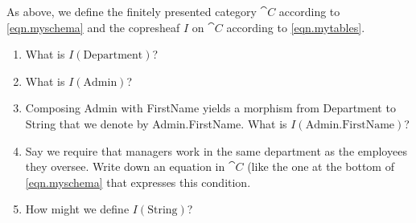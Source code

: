 \documentclass[Book-Poly]{subfiles}
\begin{document}
\begin{exercise} \label{exc.my_schema_and_tables}
As above, we define the finitely presented category $\cat{C}$ according to \eqref{eqn.myschema} and the copresheaf $I$ on $\cat{C}$ according to \eqref{eqn.mytables}.
\begin{enumerate}
    \item What is $I(\text{Department})$?
    \item What is $I(\text{Admin})$?
    \item Composing Admin with FirstName yields a morphism from Department to String that we denote by Admin.FirstName.
    What is $I(\text{Admin.FirstName})$?
    \item Say we require that managers work in the same department as the employees they oversee.
    Write down an equation in $\cat{C}$ (like the one at the bottom of \eqref{eqn.myschema} that expresses this condition.
    \item How might we define $I(\text{String})$? \qedhere
\end{enumerate}


\end{exercise}
\end{document}
